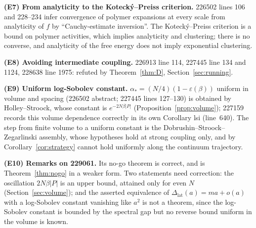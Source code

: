 \documentclass[aps,prd,twocolumn,superscriptaddress,nofootinbib,floatfix]{revtex4-2}
\theoremstyle{definition}
\theoremstyle{remark}
\newcommand{\Dlat}{\Delta_{\mathrm{lat}}}
\begin{document}
\textbf{(E7) From analyticity to the Koteck\'y--Preiss criterion.} 226502
lines 106 and 228--234 infer convergence of polymer expansions at every
scale from analyticity of $f$ by ``Cauchy-estimate inversion''. The
Koteck\'y--Preiss criterion is a bound on polymer activities, which implies
analyticity and clustering; there is no converse, and analyticity of the
free energy does not imply exponential clustering.

\textbf{(E8) Avoiding intermediate coupling.} 226913 line 114, 227445
line 134 and 1124, 228638 line 1975: refuted by
Theorem~\ref{thm:D}, Section~\ref{sec:running}.

\textbf{(E9) Uniform log-Sobolev constant.}
$\alpha_*=(N/4)(1-\varepsilon(\beta))$ uniform in volume and spacing (226502
abstract; 227445 lines 127--130) is obtained by Holley--Stroock, whose
constant is $e^{-2N\beta|P|}$ (Proposition~\ref{prop:volume}); 227159
records this volume dependence correctly in its own Corollary lsi
(line~640). The step from finite volume to a uniform constant is the
Dobrushin--Stroock--Zegarlinski assembly, whose hypotheses hold at strong
coupling only, and by Corollary~\ref{cor:strategy} cannot hold uniformly
along the continuum trajectory.

\textbf{(E10) Remarks on 229061.} Its no-go theorem is correct, and is
Theorem~\ref{thm:nogo} in a weaker form. Two statements need correction:
the oscillation $2N\beta|P|$ is an upper bound, attained only for even $N$
(Section~\ref{sec:volume}); and the asserted equivalence of
$\Dlat(a)=ma+o(a)$ with a log-Sobolev constant vanishing like $a^2$ is not
a theorem, since the log-Sobolev constant is bounded by the spectral gap
but no reverse bound uniform in the volume is known.
\end{document}
